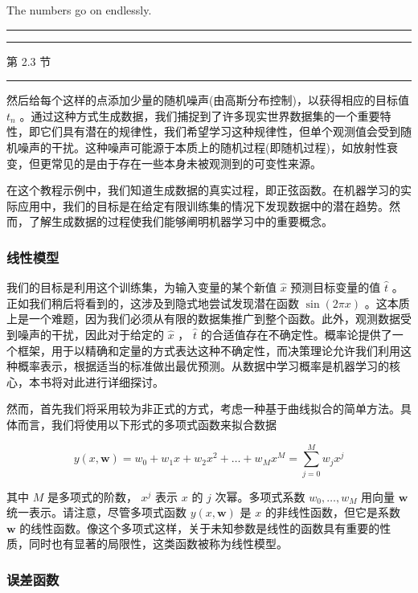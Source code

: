 \documentclass[10pt]{article}
\newcommand{\HRule}{\begin{center}\rule{0.9\linewidth}{0.2mm}\end{center}}
\begin{document}
\hspace*{1em} The numbers go on endlessly.

\HRule

\HRule

第 2.3 节

\HRule

然后给每个这样的点添加少量的随机噪声(由高斯分布控制)，以获得相应的目标值 \({t}_{n}\) 。通过这种方式生成数据，我们捕捉到了许多现实世界数据集的一个重要特性，即它们具有潜在的规律性，我们希望学习这种规律性，但单个观测值会受到随机噪声的干扰。这种噪声可能源于本质上的随机过程(即随机过程)，如放射性衰变，但更常见的是由于存在一些本身未被观测到的可变性来源。

在这个教程示例中，我们知道生成数据的真实过程，即正弦函数。在机器学习的实际应用中，我们的目标是在给定有限训练集的情况下发现数据中的潜在趋势。然而，了解生成数据的过程使我们能够阐明机器学习中的重要概念。

\subsubsection{线性模型}

我们的目标是利用这个训练集，为输入变量的某个新值 \(\widehat{x}\) 预测目标变量的值 \(\widehat{t}\) 。正如我们稍后将看到的，这涉及到隐式地尝试发现潜在函数 \(\sin \left( {2\pi x}\right)\) 。这本质上是一个难题，因为我们必须从有限的数据集推广到整个函数。此外，观测数据受到噪声的干扰，因此对于给定的 \(\widehat{x}\) ， \(\widehat{t}\) 的合适值存在不确定性。概率论提供了一个框架，用于以精确和定量的方式表达这种不确定性，而决策理论允许我们利用这种概率表示，根据适当的标准做出最优预测。从数据中学习概率是机器学习的核心，本书将对此进行详细探讨。


然而，首先我们将采用较为非正式的方式，考虑一种基于曲线拟合的简单方法。具体而言，我们将使用以下形式的多项式函数来拟合数据

\[
y\left( {x,\mathbf{w}}\right)  = {w}_{0} + {w}_{1}x + {w}_{2}{x}^{2} + \ldots  + {w}_{M}{x}^{M} = \mathop{\sum }\limits_{{j = 0}}^{M}{w}_{j}{x}^{j} \tag{1.1}
\]

其中 \(M\) 是多项式的阶数， \({x}^{j}\) 表示 \(x\) 的 \(j\) 次幂。多项式系数 \({w}_{0},\ldots ,{w}_{M}\) 用向量 \(\mathbf{w}\) 统一表示。请注意，尽管多项式函数 \(y\left( {x,\mathbf{w}}\right)\) 是 \(x\) 的非线性函数，但它是系数 \(\mathbf{w}\) 的线性函数。像这个多项式这样，关于未知参数是线性的函数具有重要的性质，同时也有显著的局限性，这类函数被称为线性模型。



\subsubsection{误差函数}
\end{document}
